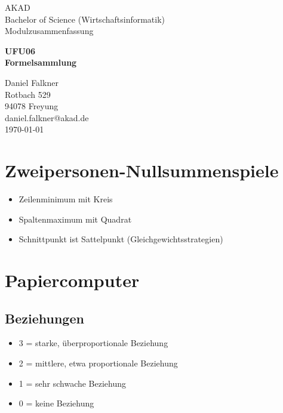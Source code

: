 \documentclass[a4paper,12pt]{scrartcl}
\begin{document}
\begin{titlepage}
\begin{small}
\vfill {AKAD\\ 
Bachelor of Science (Wirtschaftsinformatik) \\ 
Modulzusammenfassung}
\end{small}


\begin{center}
\begin{Large}
\vfill {\textsf{\textbf{
UFU06 \\
\vspace*{1cm} 
Formelsammlung
}}}
\end{Large}
\end{center}

\begin{small}
\vfill Daniel Falkner \\ Rotbach 529 \\  94078 Freyung \\  daniel.falkner@akad.de \\ 
\today
\end{small}

\end{titlepage}


\tableofcontents
\thispagestyle{empty}

\clearpage

\onehalfspacing

\pagestyle{plain}


\section{Zweipersonen-Nullsummenspiele}
\begin{itemize}
\item Zeilenminimum mit Kreis
\item Spaltenmaximum mit Quadrat
\item Schnittpunkt ist Sattelpunkt (Gleichgewichtsstrategien)
\end{itemize}

\section{Papiercomputer}
\subsection{Beziehungen}
\begin{itemize}
\item 3 = starke, überproportionale Beziehung
\item 2 = mittlere, etwa proportionale Beziehung
\item 1 = sehr schwache Beziehung
\item 0 = keine Beziehung
\end{itemize}
\end{document}
